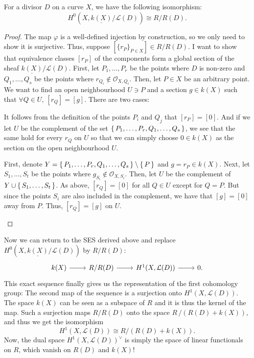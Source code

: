 \documentclass[12pt]{article}
\begin{document}
\begin{lemm}
  For a divisor $D$ on a curve $X$, we have the following isomorphism:
  \[
    H^{0}(X,\underline{k(X)}/\mathcal{L}(D))\cong R/R(D).
  \]
\end{lemm}
\begin{proof}
  The map $\varphi$ is a well-defined injection by construction,
  so we only need to show it is surjective. Thus,
  suppose $[\{r_{P}\}_{P\in X}]\in R/R(D)$. I want to show that equivalence
  classes $[r_{P}]$ of the components form a global section of the sheaf
  $\underline{k(X)}/\mathcal{L}(D)$. First, let $P_{1},\ldots,P_{r}$
  be the points where $D$ is non-zero and $Q_{1},\ldots,Q_{s}$ be the
  points where $r_{Q_{i}}\not\in \mathscr{O}_{X,Q_{i}}$. Then, let $P\in X$
  be an arbitrary point. We want to find an open neighbourhood $U\ni P$
  and a section $g\in k(X)$ such that $\forall Q\in U,\ [r_{Q}]=[g]$.
  There are two cases:
  \begin{description}[style=nextline]
    \item[$P\not\in\set{P_{1},\ldots,P_{r},Q_{1},\ldots,Q_{s}}\big)$]
          It follows from the definition of the points $P_{i}$ and $Q_{j}$
          that $[r_{P}]=[0]$. And if we let $U$ be the complement of
          the set $\set{P_{1},\ldots,P_{r},Q_{1},\ldots,Q_{s}}$, we see
          that the same hold for every $r_{Q}$ on $U$ so that we can simply
          choose $0\in k(X)$ as the section on the open neighbourhood $U$.
    \item[$P\in\set{P_{1},\ldots,P_{r},Q_{1},\ldots,Q_{s}}\big)$]
          First, denote $Y=\set{P_{1},\ldots,P_{r},Q_{1},\ldots,Q_{s}}
          \setminus \set{P}$ and $g=r_{P}\in k(X)$. Next, let
          $S_{1},\ldots,S_{t}$ be the points where
          $g_{S_{i}}\not\in\mathscr{O}_{X,S_{i}}$. Then, let $U$ be
          the complement of $Y\cup \set{S_{1},\ldots,S_{t}}$. As above,
          $[r_{Q}]=[0]$ for all $Q\in U$ except for $Q=P$. But since
          the points $S_{i}$ are also included in the complement, we have
          that $[g]=[0]$ away from $P$. Thus, $[r_{Q}]=[g]$ on $U$.
  \end{description}
\end{proof}
Now we can return to the SES derived above and replace
$H^{0}(X,\underline{k(X)}/\mathcal{L}(D))$ by $R/R(D)$:
\[
  \begin{tikzcd}
    k(X)\arrow{r} & R/R(D)\arrow{r} & H^{1}(X,\mathcal{L}(D))\arrow{r} & 0.
  \end{tikzcd}
\]
This exact sequence finally gives us the representation of the first
cohomology group: The second map of the sequence is a surjection
onto $H^{1}(X,\mathcal{L}(D))$. The space $k(X)$ can be seen as a subspace
of $R$ and it is thus the kernel of the map. Such a surjection maps $R/R(D)$
onto the space $R\,/\left(R(D)+k(X)\right)$, and thus we get the isomorphism
\[H^{1}(X,\mathcal{L}(D))\cong R/\left(R(D)+k(X)\right).\]
Now, the dual space $H^{1}(X,\mathcal{L}(D))^{\vee}$ is simply the space
of linear functionals on $R$, which vanish on $R(D)$ and $k(X)$!
\end{document}
